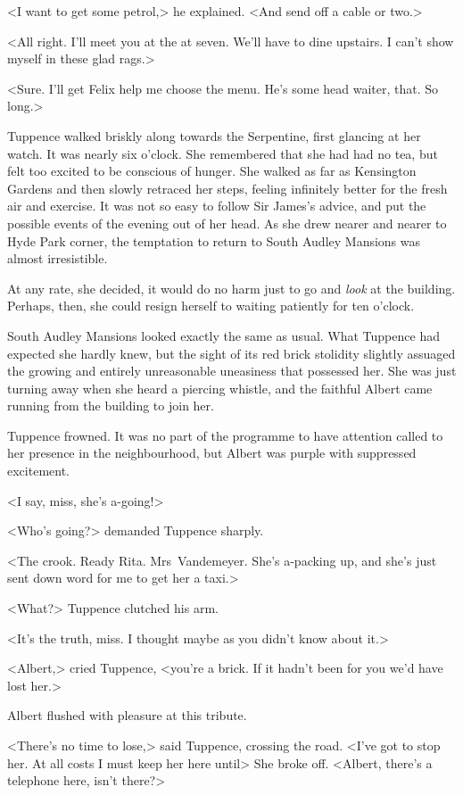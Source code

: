 <I want to get some petrol,> he explained. <And send off a cable or two.>

<All right. I'll meet you at the  at seven. We'll have to dine upstairs. I can't show myself in these glad rags.>

<Sure. I'll get Felix help me choose the menu. He's some head waiter, that. So long.>

Tuppence walked briskly along towards the Serpentine, first glancing at her watch. It was nearly six o'clock. She remembered that she had had no tea, but felt too excited to be conscious of hunger. She walked as far as Kensington Gardens and then slowly retraced her steps, feeling infinitely better for the fresh air and exercise. It was not so easy to follow Sir James's advice, and put the possible events of the evening out of her head. As she drew nearer and nearer to Hyde Park corner, the temptation to return to South Audley Mansions was almost irresistible.

At any rate, she decided, it would do no harm just to go and \emph{look} at the building. Perhaps, then, she could resign herself to waiting patiently for ten o'clock.

South Audley Mansions looked exactly the same as usual. What Tuppence had expected she hardly knew, but the sight of its red brick stolidity slightly assuaged the growing and entirely unreasonable uneasiness that possessed her. She was just turning away when she heard a piercing whistle, and the faithful Albert came running from the building to join her.

Tuppence frowned. It was no part of the programme to have attention called to her presence in the neighbourhood, but Albert was purple with suppressed excitement.

<I say, miss, she's a-going!>

<Who's going?> demanded Tuppence sharply.

<The crook. Ready Rita. Mrs~Vandemeyer. She's a-packing up, and she's just sent down word for me to get her a taxi.>

<What?> Tuppence clutched his arm.

<It's the truth, miss. I thought maybe as you didn't know about it.>

<Albert,> cried Tuppence, <you're a brick. If it hadn't been for you we'd have lost her.>

Albert flushed with pleasure at this tribute.

<There's no time to lose,> said Tuppence, crossing the road. <I've got to stop her. At all costs I must keep her here until\longdash> She broke off. <Albert, there's a telephone here, isn't there?>

